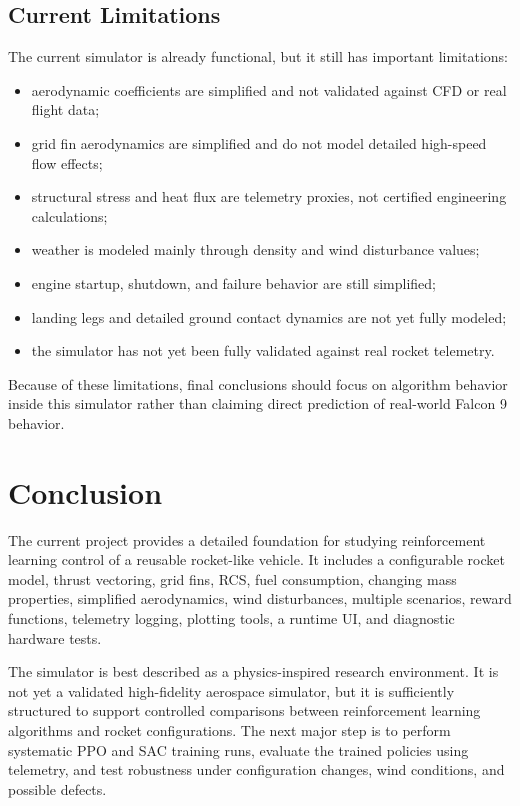 \documentclass{article}
\begin{document}
\subsection{Current Limitations}

The current simulator is already functional, but it still has important limitations:

\begin{itemize}
    \item aerodynamic coefficients are simplified and not validated against CFD or real flight data;
    \item grid fin aerodynamics are simplified and do not model detailed high-speed flow effects;
    \item structural stress and heat flux are telemetry proxies, not certified engineering calculations;
    \item weather is modeled mainly through density and wind disturbance values;
    \item engine startup, shutdown, and failure behavior are still simplified;
    \item landing legs and detailed ground contact dynamics are not yet fully modeled;
    \item the simulator has not yet been fully validated against real rocket telemetry.
\end{itemize}

Because of these limitations, final conclusions should focus on algorithm behavior inside this simulator rather than claiming direct prediction of real-world Falcon 9 behavior.

\section{Conclusion}

The current project provides a detailed foundation for studying reinforcement learning control of a reusable rocket-like vehicle. It includes a configurable rocket model, thrust vectoring, grid fins, RCS, fuel consumption, changing mass properties, simplified aerodynamics, wind disturbances, multiple scenarios, reward functions, telemetry logging, plotting tools, a runtime UI, and diagnostic hardware tests.

The simulator is best described as a physics-inspired research environment. It is not yet a validated high-fidelity aerospace simulator, but it is sufficiently structured to support controlled comparisons between reinforcement learning algorithms and rocket configurations. The next major step is to perform systematic PPO and SAC training runs, evaluate the trained policies using telemetry, and test robustness under configuration changes, wind conditions, and possible defects.
\end{document}
